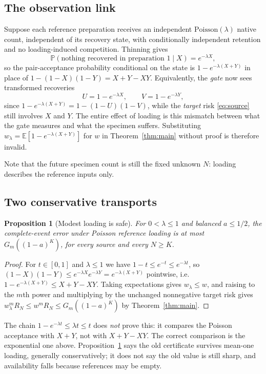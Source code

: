 \documentclass[11pt]{article}
\newtheorem{proposition}[theorem]{Proposition}
\theoremstyle{remark}\newtheorem{remark}[theorem]{Remark}
\newcommand{\E}{\mathbb E}
\newcommand{\Prob}{\mathbb P}
\begin{document}
\subsection{The observation link}
Suppose each reference preparation receives an independent $\mathrm{Poisson}
(\lambda)$ native count, independent of its recovery state, with conditionally
independent retention and no loading-induced competition. Thinning gives
\begin{equation}\label{eq:poissonlink}
\Prob(\text{nothing recovered in preparation 1}\mid X)=e^{-\lambda X},
\end{equation}
so the pair-acceptance probability conditional on the state is
$1-e^{-\lambda(X+Y)}$ in place of $1-(1-X)(1-Y)=X+Y-XY$. Equivalently, the
\emph{gate} now sees transformed recoveries
\begin{equation}\label{eq:U}
U=1-e^{-\lambda X},\qquad V=1-e^{-\lambda Y},
\end{equation}
since $1-e^{-\lambda(X+Y)}=1-(1-U)(1-V)$, while the \emph{target} risk
\eqref{eq:source} still involves $X$ and $Y$. The entire effect of loading is
this mismatch between what the gate measures and what the specimen suffers.
Substituting $w_\lambda=\E[1-e^{-\lambda(X+Y)}]$ for $w$ in
Theorem~\ref{thm:main} without proof is therefore invalid.

Note that the future specimen count is still the fixed unknown $N$: loading
describes the reference inputs only.

\subsection{Two conservative transports}
\begin{proposition}[Modest loading is safe]\label{prop:poissonsafe}
For $0<\lambda\le1$ and balanced $a\le1/2$, the complete-event error under
Poisson reference loading is at most $G_m((1-a)^K)$, for every source and every
$N\ge K$.
\end{proposition}
\begin{proof}
For $t\in[0,1]$ and $\lambda\le1$ we have $1-t\le e^{-t}\le e^{-\lambda t}$, so
$(1-X)(1-Y)\le e^{-\lambda X}e^{-\lambda Y}=e^{-\lambda(X+Y)}$ pointwise, i.e.
$1-e^{-\lambda(X+Y)}\le X+Y-XY$. Taking expectations gives $w_\lambda\le w$, and
raising to the $m$th power and multiplying by the unchanged nonnegative target
risk gives $w_\lambda^mR_N\le w^mR_N\le G_m((1-a)^K)$ by
Theorem~\ref{thm:main}.
\end{proof}

The chain $1-e^{-\lambda t}\le\lambda t\le t$ does \emph{not} prove this: it
compares the Poisson acceptance with $X+Y$, not with $X+Y-XY$. The correct
comparison is the exponential one above. Proposition~\ref{prop:poissonsafe} says
the old certificate survives mean-one loading, generally conservatively; it does
not say the old value is still sharp, and availability falls because references
may be empty.
\end{document}
